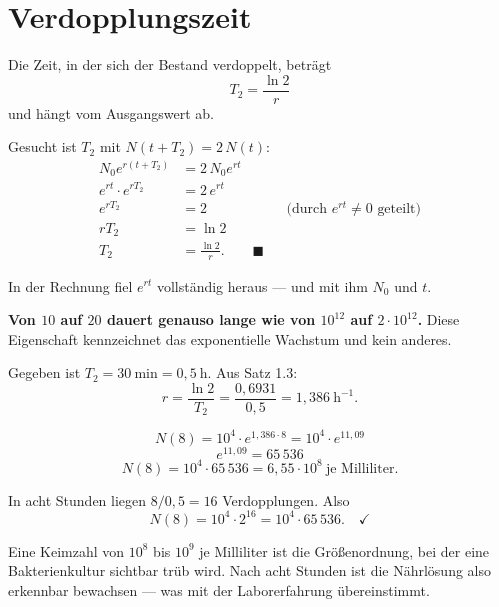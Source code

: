\section{Verdopplungszeit}

\begin{merksatz}
Die Zeit, in der sich der Bestand verdoppelt, beträgt
\[ T_2 = \frac{\ln 2}{r} \]
und hängt  vom Ausgangswert ab.

Gesucht ist $T_2$ mit $N(t+T_2) = 2\,N(t)$:
\begin{align*}
N_0e^{r(t+T_2)} &= 2\,N_0e^{rt}\\
e^{rt}\cdot e^{rT_2} &= 2\,e^{rt}\\
e^{rT_2} &= 2 && \text{(durch } e^{rt} \neq 0 \text{ geteilt)}\\
rT_2 &= \ln 2\\
T_2 &= \frac{\ln 2}{r} . \qquad \blacksquare
\end{align*}

In der Rechnung fiel $e^{rt}$ vollständig heraus --- und mit ihm $N_0$ und $t$.

\begin{center}
\begin{minipage}{0.9\textwidth}
\textbf{Von $10$ auf $20$ dauert genauso lange wie von $10^{12}$ auf $2\cdot10^{12}$.} Diese Eigenschaft kennzeichnet das exponentielle Wachstum und kein anderes.
\end{minipage}
\end{center}
\end{merksatz}

\begin{merksatz}
Gegeben ist $T_2 = 30\ \text{min} = 0{,}5\ \text{h}$. Aus Satz 1.3:
\[ r = \frac{\ln 2}{T_2} = \frac{0{,}6931}{0{,}5} = 1{,}386\ \mathrm{h}^{-1} . \]

\[ N(8) = 10^4 \cdot e^{1{,}386 \cdot 8} = 10^4 \cdot e^{11{,}09} \]
\[ e^{11{,}09} = 65\,536 \]
\[ N(8) = 10^4 \cdot 65\,536 = 6{,}55 \cdot 10^{8} \ \text{je Milliliter} . \]

In acht Stunden liegen $8/0{,}5 = 16$ Verdopplungen. Also
\[ N(8) = 10^4 \cdot 2^{16} = 10^4 \cdot 65\,536 . \quad \checkmark \]

\begin{center}
\begin{minipage}{0.88\textwidth}
\end{minipage}
\end{center}

Eine Keimzahl von $10^8$ bis $10^9$ je Milliliter ist die Größenordnung, bei der eine Bakterienkultur sichtbar trüb wird. Nach acht Stunden ist die Nährlösung also erkennbar bewachsen --- was mit der Laborerfahrung übereinstimmt.
\end{merksatz}

